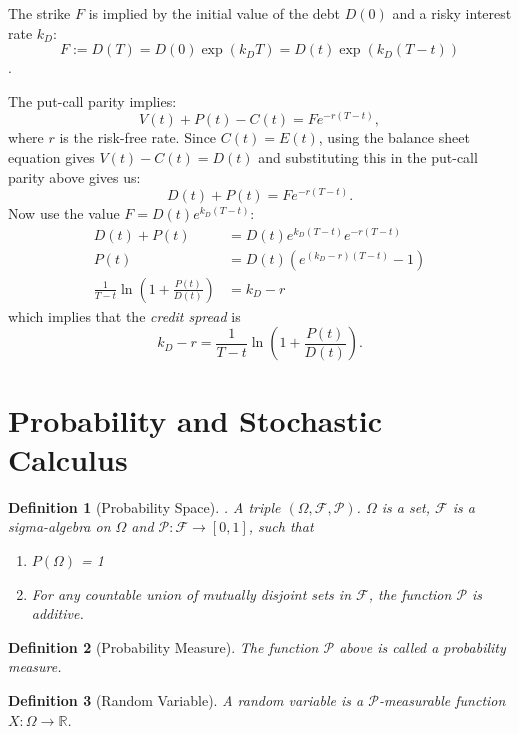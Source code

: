 \documentclass{amsart}
\theoremstyle{plain}
\newtheorem{definition}{Definition}
\numberwithin{equation}{section}
\begin{document}
The strike $F$ is implied by the initial value of the 
debt $D(0)$ and a risky interest rate $k_D$:
$$F := D(T) = D(0)\exp(k_DT) = D(t)\exp(k_D(T-t))$$.

The put-call parity implies:
$$V(t) + P(t) - C(t) = F e^{-r(T-t)},$$
where $r$ is the risk-free rate.
Since $C(t) = E(t)$, using the balance 
sheet equation gives $V(t)-C(t)=D(t)$ and 
substituting this in the put-call parity 
above gives us:
$$D(t) + P(t) = F e^{-r(T-t)}.$$
Now use the value $F = D(t) e^{k_D(T-t)}$:
\begin{align*}
D(t) + P(t) &= D(t) e^{k_D(T-t)} e^{-r(T-t)}\\
P(t) &= D(t)\left(e^{(k_D-r)(T-t)} - 1\right)\\
\frac{1}{T-t}\ln\left(1+\frac{P(t)}{D(t)}\right) &= k_D-r
\end{align*}
which implies that the \emph{credit spread} 
is 
$$k_D - r = \frac{1}{T-t}\ln\left(1+\frac{P(t)}{D(t)}\right).$$

\section{Probability and Stochastic Calculus}

\begin{definition}[Probability Space]. 
A triple $(\Omega, \mathcal{F}, \mathcal{P})$.
$\Omega$ is a set, $\mathcal{F}$ is a sigma-algebra
on $\Omega$ and $\mathcal{P}: \mathcal{F} \to [0, 1]$,
such that 
\begin{enumerate}
	\item $P(\Omega)$ = 1
	\item For any countable union of mutually disjoint sets in $\mathcal{F}$, the 
	function $\mathcal{P}$ is additive.
\end{enumerate}
\end{definition}
\begin{definition}[Probability Measure]
The function $\mathcal{P}$ above is called a probability measure.
\end{definition}

\begin{definition}[Random Variable]
A random variable is a $\mathcal{P}$-measurable function $X:\Omega \to \mathbb{R}$.
\end{definition}
\end{document}
